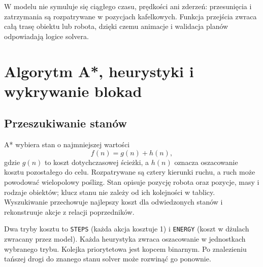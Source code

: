 \documentclass[a4paper,11pt]{article}
\begin{document}
W modelu nie symuluje się ciągłego czasu, prędkości ani zderzeń: przesunięcia i zatrzymania są rozpatrywane w pozycjach kafelkowych. Funkcja przejścia zwraca całą trasę obiektu lub robota, dzięki czemu animacje i walidacja planów odpowiadają logice solvera.

\section{Algorytm A*, heurystyki i wykrywanie blokad}
\subsection{Przeszukiwanie stanów}
A* wybiera stan o najmniejszej wartości
\begin{equation}
  f(n)=g(n)+h(n),
\end{equation}
gdzie $g(n)$ to koszt dotychczasowej ścieżki, a $h(n)$ oznacza oszacowanie kosztu pozostałego do celu. Rozpatrywane są cztery kierunki ruchu, a ruch może powodować wielopolowy poślizg. Stan opisuje pozycję robota oraz pozycje, masy i rodzaje obiektów; klucz stanu nie zależy od ich kolejności w tablicy. Wyszukiwanie przechowuje najlepszy koszt dla odwiedzonych stanów i rekonstruuje akcje z relacji poprzedników.

Dwa tryby kosztu to \texttt{STEPS} (każda akcja kosztuje 1) i \texttt{ENERGY} (koszt w dżulach zwracany przez model). Każda heurystyka zwraca oszacowanie w jednostkach wybranego trybu. Kolejka priorytetowa jest kopcem binarnym. Po znalezieniu tańszej drogi do znanego stanu solver może rozwinąć go ponownie.
\end{document}
